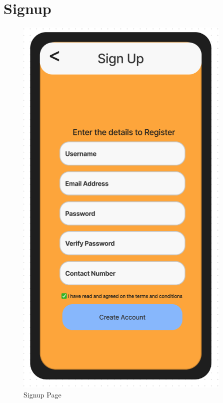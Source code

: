 \documentclass[title page]{article}
\begin{document}
\section{Signup}
\begin{figure}[!h]
    \begin{center}
          \includegraphics[height=19cm]{signup.png}
          \caption{Signup Page}
          \label{fig:signup}
    \end{center}
\end{figure}
\end{document}
